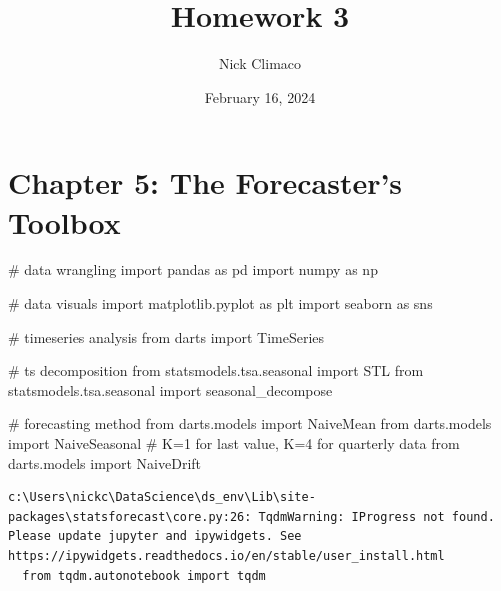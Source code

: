\documentclass[
  11pt,
]{article}
\title{Homework 3}
\author{Nick Climaco}
\date{February 16, 2024}
\newenvironment{Shaded}{\begin{snugshade}}{\end{snugshade}}
\newcommand{\CommentTok}[1]{\textcolor[rgb]{0.37,0.37,0.37}{#1}}
\newcommand{\ImportTok}[1]{\textcolor[rgb]{0.00,0.46,0.62}{#1}}
\newcommand{\NormalTok}[1]{\textcolor[rgb]{0.00,0.23,0.31}{#1}}
\renewcommand*\contentsname{Table of contents}
\newcommand\contentsname{Table of contents}
\begin{document}
\maketitle


\renewcommand*\contentsname{Table of contents}
{
\hypersetup{linkcolor=}
\setcounter{tocdepth}{3}
\tableofcontents
}
\newpage

\section{Chapter 5: The Forecaster's
Toolbox}\label{chapter-5-the-forecasters-toolbox}

\begin{Shaded}
\begin{Highlighting}[]
\CommentTok{\# data wrangling }
\ImportTok{import}\NormalTok{ pandas }\ImportTok{as}\NormalTok{ pd }
\ImportTok{import}\NormalTok{ numpy }\ImportTok{as}\NormalTok{ np}

\CommentTok{\# data visuals}
\ImportTok{import}\NormalTok{ matplotlib.pyplot }\ImportTok{as}\NormalTok{ plt }
\ImportTok{import}\NormalTok{ seaborn }\ImportTok{as}\NormalTok{ sns}

\CommentTok{\# timeseries analysis}
\ImportTok{from}\NormalTok{ darts }\ImportTok{import}\NormalTok{ TimeSeries}

\CommentTok{\# ts decomposition}
\ImportTok{from}\NormalTok{ statsmodels.tsa.seasonal }\ImportTok{import}\NormalTok{ STL}
\ImportTok{from}\NormalTok{ statsmodels.tsa.seasonal }\ImportTok{import}\NormalTok{ seasonal\_decompose}

\CommentTok{\# forecasting method}
\ImportTok{from}\NormalTok{ darts.models }\ImportTok{import}\NormalTok{ NaiveMean}
\ImportTok{from}\NormalTok{ darts.models }\ImportTok{import}\NormalTok{ NaiveSeasonal }\CommentTok{\# K=1 for last value, K=4 for quarterly data}
\ImportTok{from}\NormalTok{ darts.models }\ImportTok{import}\NormalTok{ NaiveDrift}
\end{Highlighting}
\end{Shaded}

\begin{verbatim}
c:\Users\nickc\DataScience\ds_env\Lib\site-packages\statsforecast\core.py:26: TqdmWarning: IProgress not found. Please update jupyter and ipywidgets. See https://ipywidgets.readthedocs.io/en/stable/user_install.html
  from tqdm.autonotebook import tqdm
\end{verbatim}
\end{document}
